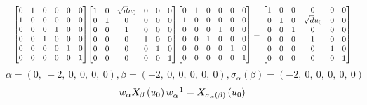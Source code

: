 \documentclass[11pt]{article}
\theoremstyle{definition}
\begin{document}
\[
\scaletoalign{\textwidth}{{\left[\begin{matrix}0 & 1 & 0 & 0 & 0 & 0\\1 & 0 & 0 & 0 & 0 & 0\\0 & 0 & 0 & 1 & 0 & 0\\0 & 0 & 1 & 0 & 0 & 0\\0 & 0 & 0 & 0 & 1 & 0\\0 & 0 & 0 & 0 & 0 & 1\end{matrix}\right]} {\left[\begin{matrix}1 & 0 & \sqrt{d} u_{0} & 0 & 0 & 0\\0 & 1 & 0 & 0 & 0 & 0\\0 & 0 & 1 & 0 & 0 & 0\\0 & 0 & 0 & 1 & 0 & 0\\0 & 0 & 0 & 0 & 1 & 0\\0 & 0 & 0 & 0 & 0 & 1\end{matrix}\right]} {\left[\begin{matrix}0 & 1 & 0 & 0 & 0 & 0\\1 & 0 & 0 & 0 & 0 & 0\\0 & 0 & 0 & 1 & 0 & 0\\0 & 0 & 1 & 0 & 0 & 0\\0 & 0 & 0 & 0 & 1 & 0\\0 & 0 & 0 & 0 & 0 & 1\end{matrix}\right]} = {\left[\begin{matrix}1 & 0 & 0 & 0 & 0 & 0\\0 & 1 & 0 & \sqrt{d} u_{0} & 0 & 0\\0 & 0 & 1 & 0 & 0 & 0\\0 & 0 & 0 & 1 & 0 & 0\\0 & 0 & 0 & 0 & 1 & 0\\0 & 0 & 0 & 0 & 0 & 1\end{matrix}\right]}}
\]
\[
\alpha = \left( 0, \  -2, \  0, \  0, \  0, \  0\right), \beta = \left( -2, \  0, \  0, \  0, \  0, \  0\right), \sigma_{\alpha}(\beta) = \left( -2, \  0, \  0, \  0, \  0, \  0\right)
\]
\[
\scaletoalign{\textwidth}{w_{\alpha} X_{\beta}\left(u_{0}\right) w_{\alpha}^{-1} = X_{\sigma_{\alpha}\left(\beta\right)}\left(u_{0}\right)}
\]
\end{document}
